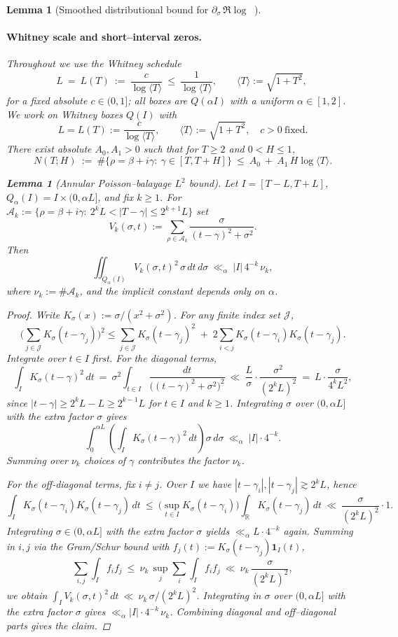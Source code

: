 \documentclass[11pt]{article}
\newtheorem{lemma}[theorem]{Lemma}
\theoremstyle{definition}
\theoremstyle{remark}
\newcommand{\R}{\mathbb{R}}
\DeclareMathOperator{\dettwo}{det_2}
\begin{document}
\begin{lemma}[Smoothed distributional bound for $\partial_\sigma\,\Re\log\dettwo$]
\paragraph{Whitney scale and short–interval zeros.}
Throughout we use the Whitney schedule
\[
  L\ =\ L(T)\ :=\ \frac{c}{\log\langle T\rangle}\ \le\ \frac{1}{\log\langle T\rangle},\qquad \langle T\rangle:=\sqrt{1+T^2},\
\]
for a fixed absolute $c\in(0,1]$; all boxes are $Q(\alpha I)$ with a uniform $\alpha\in[1,2]$.
We work on Whitney boxes $Q(I)$ with
\[
  L=L(T):=\frac{c}{\log\langle T\rangle},\qquad \langle T\rangle:=\sqrt{1+T^2},\quad c>0\ \text{fixed}.
\]
There exist absolute $A_0,A_1>0$ such that for $T\ge2$ and $0<H\le1$,
\[
  N(T;H)\ :=\ \#\{\rho=\beta+i\gamma:\ \gamma\in[T,T+H]\}\ \le\ A_0\ +\ A_1\,H\log\langle T\rangle.
\]
\begin{lemma}[Annular Poisson--balayage $L^2$ bound]\label{lem:annular-balayage}
Let $I=[T-L,T+L]$, $Q_\alpha(I)=I\times(0,\alpha L]$, and fix $k\ge1$. For
$\mathcal A_k:=\{\rho=\beta+i\gamma:\ 2^kL<|T-\gamma|\le 2^{k+1}L\}$ set
\[
  V_k(\sigma,t):=\sum_{\rho\in\mathcal A_k}\frac{\sigma}{(t-\gamma)^2+\sigma^2}.
\]
Then
\[
  \iint_{Q_\alpha(I)} V_k(\sigma,t)^2\,\sigma\,dt\,d\sigma\ \ll_\alpha\ |I|\,4^{-k}\,\nu_k,
\]
where $\nu_k:=\#\mathcal A_k$, and the implicit constant depends only on $\alpha$.
\end{lemma}
\begin{proof}
Write $K_\sigma(x):=\sigma/(x^2+\sigma^2)$. For any finite index set $\mathcal J$,
\[
  \Big(\sum_{j\in\mathcal J} K_\sigma(t-\gamma_j)\Big)^2
  \le \sum_{j\in\mathcal J} K_\sigma(t-\gamma_j)^2 \;+\;
       2\!\!\sum_{i<j} K_\sigma(t-\gamma_i)K_\sigma(t-\gamma_j).
\]
Integrate over $t\in I$ first. For the diagonal terms,
\[
 \int_I K_\sigma(t-\gamma)^2\,dt\ =\ \sigma^2\!\int_{t\in I}\frac{dt}{\big((t-\gamma)^2+\sigma^2\big)^2}
 \ \ll\ \frac{L}{\sigma}\cdot\frac{\sigma^2}{(2^kL)^2}\ =\ L\cdot\frac{\sigma}{4^k L^2},
\]
since $|t-\gamma|\ge 2^kL-L\ge 2^{k-1}L$ for $t\in I$ and $k\ge1$. Integrating $\sigma$ over $(0,\alpha L]$ with the extra factor $\sigma$ gives
\[
 \int_0^{\alpha L}\!\!\left(\int_I K_\sigma(t-\gamma)^2\,dt\right)\sigma\,d\sigma\ \ll_\alpha\ |I|\cdot 4^{-k}.
\]
Summing over $\nu_k$ choices of $\gamma$ contributes the factor $\nu_k$.

For the off-diagonal terms, fix $i\neq j$. Over $I$ we have $|t-\gamma_i|,|t-\gamma_j|\gtrsim 2^kL$, hence
\[
 \int_I K_\sigma(t-\gamma_i)K_\sigma(t-\gamma_j)\,dt
 \ \le\ \Big(\sup_{t\in I}K_\sigma(t-\gamma_i)\Big)\!\int_\R \!K_\sigma(t-\gamma_j)\,dt
 \ \ll\ \frac{\sigma}{(2^kL)^2}\cdot 1.
\]
Integrating $\sigma\in(0,\alpha L]$ with the extra factor $\sigma$ yields $\ll_\alpha L\cdot 4^{-k}$ again. Summing in $i,j$ via the Gram/Schur bound with $f_j(t):=K_\sigma(t-\gamma_j)\mathbf 1_I(t)$,
\[\sum_{i,j}\int_I f_i f_j\ \le\ \nu_k\,\sup_j\sum_i\int_I f_i f_j\ \ll\ \nu_k\,\frac{\sigma}{(2^kL)^2},\]
we obtain $\int_I V_k(\sigma,t)^2\,dt\ \ll\ \nu_k\,\sigma/(2^kL)^2$. Integrating in $\sigma$ over $(0,\alpha L]$ with the extra factor $\sigma$ gives $\ll_\alpha |I|\cdot 4^{-k}\,\nu_k$. Combining diagonal and off--diagonal parts gives the claim.
\end{proof}


\end{lemma}
\end{document}
